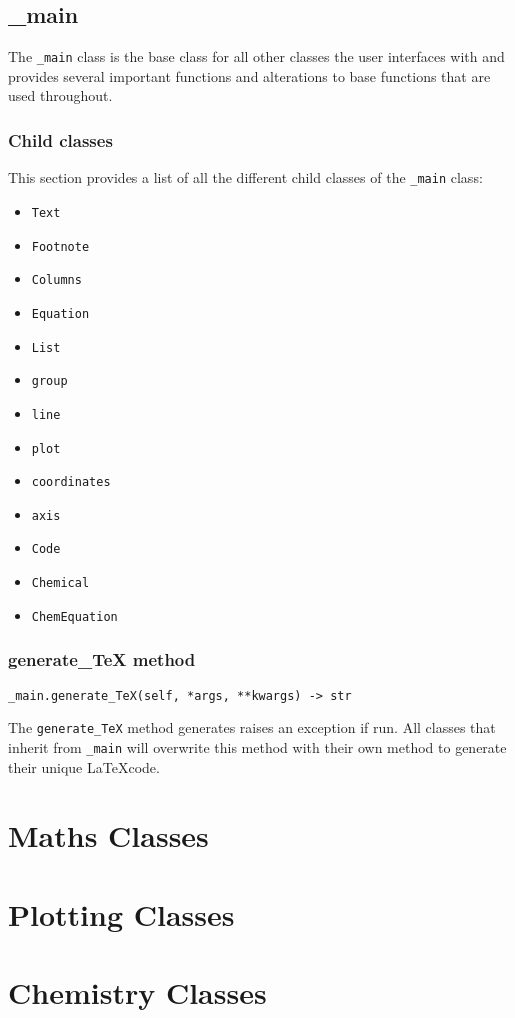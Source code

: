 \documentclass{article}
\begin{document}
\subsection[\_main]{\_main}
The \verb|_main| class is the base class for all other classes the user interfaces with and provides several important functions and alterations to base functions that are used throughout.\subsubsection[Child classes]{Child classes}
This section provides a list of all the different child classes of the \verb|_main| class:\begin{multicols}{2}\begin{itemize}
\item \verb|Text|
\item \verb|Footnote|
\item \verb|Columns|
\item \verb|Equation|
\item \verb|List|
\item \verb|group|
\item \verb|line|
\item \verb|plot|
\item \verb|coordinates|
\item \verb|axis|
\item \verb|Code|
\item \verb|Chemical|
\item \verb|ChemEquation|
\end{itemize}
\end{multicols}\subsubsection[generate\_TeX method]{generate\_TeX method}
\lstset{language=Python}
\begin{lstlisting}
_main.generate_TeX(self, *args, **kwargs) -> str
\end{lstlisting}
The \verb|generate_TeX| method generates raises an exception if run. All classes that inherit from \verb|_main| will overwrite this method with their own method to generate their unique \LaTeX  code.\section[Maths Classes]{Maths Classes}
\section[Plotting Classes]{Plotting Classes}
\section[Chemistry Classes]{Chemistry Classes}
\end{document}
